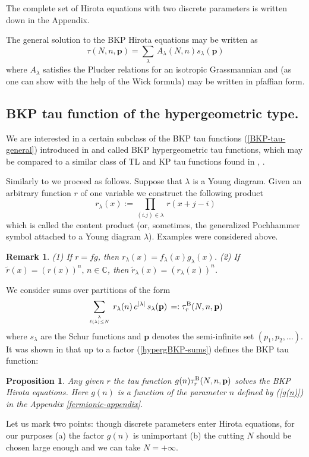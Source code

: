 \documentclass[a4paper,10pt]{article}
\newcommand{\bpow}{\mathbf{p}}
\theoremstyle{plain}
\newtheorem{Proposition}{Proposition}
\newtheorem{Remark}{Remark}
\theoremstyle{remark}
\def\bp{\begin{Proposition}}
\def\ep{\end{Proposition}}
\def\be{\begin{equation}}
\def\ee{\end{equation}}
\def\br{\begin{Remark}\rm\small}
\def\er{\end{Remark}}
\begin{document}
 The complete set of  Hirota equations with two discrete parameters is written down
in the Appendix.

The general solution to the BKP Hirota equations may be written as
\be\label{BKP-tau-general}
\tau\left(N,n,\bpow \right)=\sum_{\lambda}\,A_\lambda(N,n) s_\lambda(\bpow)
\ee
where $A_\lambda$ satisfies the Plucker relations for an isotropic Grassmannian and (as one can show with the help of the Wick formula) may be written
in pfaffian form.


\subsection{BKP tau function of the hypergeometric type.}
We are interested in a certain subclass of the BKP tau functions (\ref{BKP-tau-general}) introduced in
\cite{OST-I} and called
BKP hypergeometric tau functions, which may be compared to a similar class of TL  and KP
tau functions found in \cite{KMMM}, \cite{OS-2000}.

Similarly to  \cite{OS-2000} we proceed as follows. Suppose that $\lambda$ is a Young diagram.
Given an arbitrary function $r$ of one variable
we construct the following product
\be
r_\lambda(x):=\prod_{(i.j)\in\lambda}\, r(x+j-i)
\ee
which is called the content product (or, sometimes, the generalized Pochhammer symbol attached to a Young
diagram $\lambda$). Examples were considered above.

\br\label{gf}
 (1) If $r=fg$, then $r_\lambda(x)=f_\lambda(x)g_\lambda(x)$.
 (2) If ${\tilde r}(x)=\left(r(x)\right)^n,\,n\in\mathbb{C}$,
then ${\tilde r}_\lambda(x)=
\left({r}_\lambda(x)\right)^n$.
\er


We consider sums over partitions of the form
\be\label{hypergBKP-sums}
\sum_{\lambda \atop \ell(\lambda)\le N} \, r_\lambda(n)\, c^{|\lambda|}\, s_\lambda(\bpow) \,=
: \tau_r^{\rm B}(N,n,\bpow)
\ee
where $s_\lambda$ are the Schur functions \cite{Mac} and $\bpow$
denotes the semi-infinite set $(p_1,p_2,\dots )$.
It was shown in \cite{OST-I} that up to a factor (\ref{hypergBKP-sums}) defines the BKP tau function:
\bp
Any given $r$ the tau function $g(n)\tau^{\rm B}_r(N,n,\bpow)$ solves the BKP Hirota equations. Here
 $g(n)$ is a function of the parameter $n$
defined by (\ref{g(n)}) in the Appendix \ref{fermionic-appendix}.
\ep
Let us mark two points: though discrete parameters enter Hirota equations, for our purposes (a) the factor $g(n)$ is
unimportant (b) the cutting $N$ should be chosen large enough and we can take $N=+\infty$.
\end{document}
